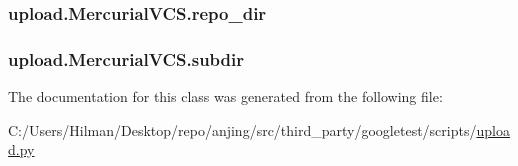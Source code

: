 \subsubsection[{repo\+\_\+dir}]{\setlength{\rightskip}{0pt plus 5cm}upload.\+Mercurial\+V\+C\+S.\+repo\+\_\+dir}\label{classupload_1_1_mercurial_v_c_s_a219c1e0ab9ce864e3231913762ea489b}
\hypertarget{classupload_1_1_mercurial_v_c_s_a0dad32e621f5523e3430d867184f0b42}{}
\subsubsection[{subdir}]{\setlength{\rightskip}{0pt plus 5cm}upload.\+Mercurial\+V\+C\+S.\+subdir}\label{classupload_1_1_mercurial_v_c_s_a0dad32e621f5523e3430d867184f0b42}


The documentation for this class was generated from the following file\+:\begin{DoxyCompactItemize}
\item 
C\+:/\+Users/\+Hilman/\+Desktop/repo/anjing/src/third\+\_\+party/googletest/scripts/\hyperlink{upload_8py}{upload.\+py}\end{DoxyCompactItemize}
